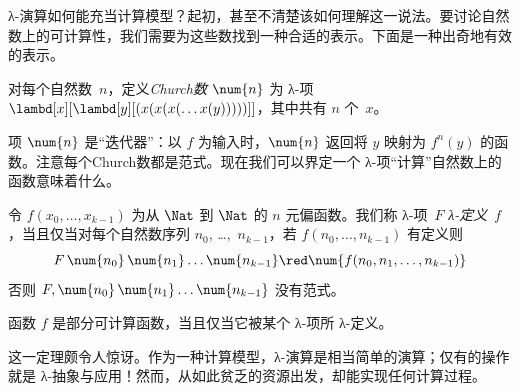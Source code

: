 \documentclass[../../../include/open-logic-section]{subfiles}
\begin{document}

λ-演算如何能充当计算模型？起初，甚至不清楚该如何理解这一说法。要讨论自然数上的可计算性，我们需要为这些数找到一种合适的表示。下面是一种出奇地有效的表示。

\begin{defn}
对每个自然数~$n$，定义\emph{Church数} $\num{n}$ 为 λ-项 $\lambd[x][\lambd[y][(x(x(x(\dots
x(y)))))]]$，其中共有 $n$ 个~$x$。
\end{defn}

项 $\num{n}$ 是“迭代器”：以 $f$ 为输入时，$\num{n}$ 返回将 $y$ 映射为 $f^n(y)$ 的函数。注意每个Church数都是范式。现在我们可以界定一个 λ-项“计算”自然数上的函数意味着什么。

\begin{defn}
令 $f(x_0, \dots, x_{k-1})$ 为从 $\Nat$ 到 $\Nat$ 的 $n$ 元偏函数。我们称 λ-项~$F$ \emph{λ-定义}~$f$，当且仅当对每个自然数序列 $n_0$, \dots,~$n_{k-1}$，若 $f(n_0, \dots, n_{k-1})$ 有定义则 \[
F\, \num{n_0}\, \num{n_1} \dots \num{n_{k-1}} \red \num{f(n_0, n_1, \dots,
  n_{k-1})}
\]否则 $F, \num{n_0}\, \num{n_1}
\dots \num{n_{k-1}}$ 没有范式。
\end{defn}

\begin{thm}
函数 $f$ 是部分可计算函数，当且仅当它被某个 λ-项所 λ-定义。
\end{thm}

\begin{explain}
这一定理颇令人惊讶。作为一种计算模型，λ-演算是相当简单的演算；仅有的操作就是 λ-抽象与应用！然而，从如此贫乏的资源出发，却能实现任何计算过程。
\end{explain}
\end{document}
